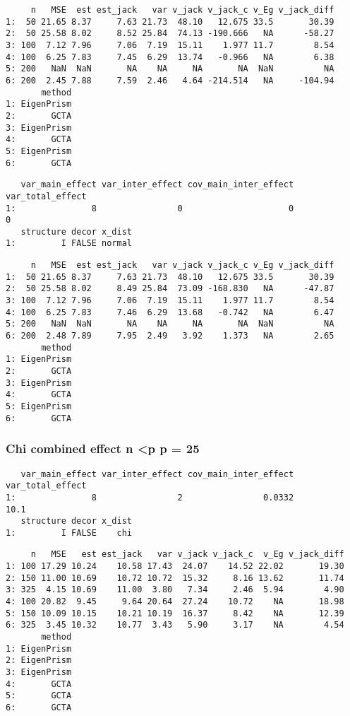 \documentclass[]{article}
\begin{document}
\begin{verbatim}
     n   MSE  est est_jack   var v_jack v_jack_c v_Eg v_jack_diff
1:  50 21.65 8.37     7.63 21.73  48.10   12.675 33.5       30.39
2:  50 25.58 8.02     8.52 25.84  74.13 -190.666   NA      -58.27
3: 100  7.12 7.96     7.06  7.19  15.11    1.977 11.7        8.54
4: 100  6.25 7.83     7.45  6.29  13.74   -0.966   NA        6.38
5: 200   NaN  NaN       NA    NA     NA       NA  NaN          NA
6: 200  2.45 7.88     7.59  2.46   4.64 -214.514   NA     -104.94
       method
1: EigenPrism
2:       GCTA
3: EigenPrism
4:       GCTA
5: EigenPrism
6:       GCTA
\end{verbatim}

\begin{verbatim}
   var_main_effect var_inter_effect cov_main_inter_effect var_total_effect
1:               8                0                     0                0
   structure decor x_dist
1:         I FALSE normal
\end{verbatim}

\begin{verbatim}
     n   MSE  est est_jack   var v_jack v_jack_c v_Eg v_jack_diff
1:  50 21.65 8.37     7.63 21.73  48.10   12.675 33.5       30.39
2:  50 25.58 8.02     8.49 25.84  73.09 -168.830   NA      -47.87
3: 100  7.12 7.96     7.06  7.19  15.11    1.977 11.7        8.54
4: 100  6.25 7.83     7.46  6.29  13.68   -0.742   NA        6.47
5: 200   NaN  NaN       NA    NA     NA       NA  NaN          NA
6: 200  2.48 7.89     7.95  2.49   3.92    1.373   NA        2.65
       method
1: EigenPrism
2:       GCTA
3: EigenPrism
4:       GCTA
5: EigenPrism
6:       GCTA
\end{verbatim}

\subsubsection{Chi combined effect n \textless{}p p =
25}\label{chi-combined-effect-n-p-p-25}

\begin{verbatim}
   var_main_effect var_inter_effect cov_main_inter_effect var_total_effect
1:               8                2                0.0332             10.1
   structure decor x_dist
1:         I FALSE    chi
\end{verbatim}

\begin{verbatim}
     n   MSE   est est_jack   var v_jack v_jack_c  v_Eg v_jack_diff
1: 100 17.29 10.24    10.58 17.43  24.07    14.52 22.02       19.30
2: 150 11.00 10.69    10.72 10.72  15.32     8.16 13.62       11.74
3: 325  4.15 10.69    11.00  3.80   7.34     2.46  5.94        4.90
4: 100 20.82  9.45     9.64 20.64  27.24    10.72    NA       18.98
5: 150 10.09 10.15    10.21 10.19  16.37     8.42    NA       12.39
6: 325  3.45 10.32    10.77  3.43   5.90     3.17    NA        4.54
       method
1: EigenPrism
2: EigenPrism
3: EigenPrism
4:       GCTA
5:       GCTA
6:       GCTA
\end{verbatim}
\end{document}
